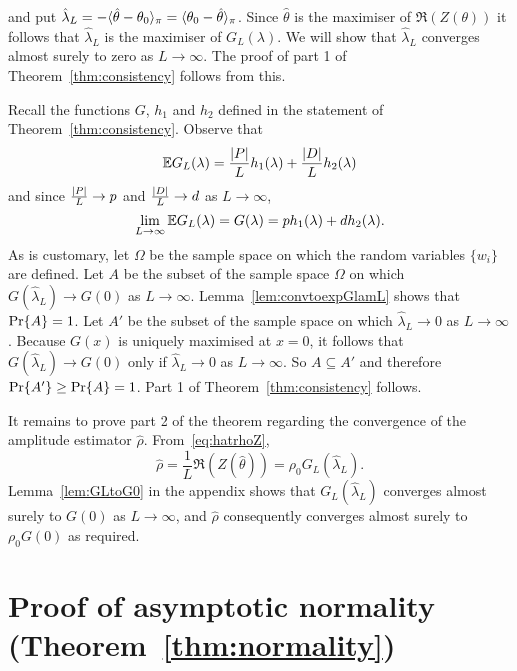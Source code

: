 \documentclass[journal]{IEEEtran}
\begin{document}
and put $\hat{\lambda}_L = -\langle \hat{\theta} - \theta_0 \rangle_\pi = \langle \theta_0 - \hat{\theta} \rangle_\pi$.  Since $\hat{\theta}$ is the maximiser of $\Re(Z(\theta))$ it follows that $\hat{\lambda}_L$ is the maximiser of $G_L(\lambda)$.  We will show that $\hat{\lambda}_L$ converges almost surely to zero as $L \rightarrow \infty$.  The proof of part 1 of Theorem~\ref{thm:consistency} follows from this.

Recall the functions $G$, $h_1$ and $h_2$ defined in the statement of Theorem~\ref{thm:consistency}.  Observe that
\[
{\mathbb E} G_L(\lambda) = \frac{{\left\vert P \right\vert}}{L} h_1(\lambda) + \frac{{\left\vert D \right\vert}}{L} h_2(\lambda)
\]
and since $\frac{{\left\vert P \right\vert}}{L} \rightarrow p$ and $\frac{{\left\vert D \right\vert}}{L} \rightarrow d$ as $L \rightarrow \infty$,
\[
\lim_{L \rightarrow\infty} {\mathbb E} G_L(\lambda) = G(\lambda) = p h_1(\lambda)   +  d h_2(\lambda).
\]
As is customary, let $\Omega$ be the sample space on which the random variables $\{w_i\}$ are defined.  Let $A$ be the subset of the sample space $\Omega$ on which $G(\hat{\lambda}_L) \rightarrow G(0)$ as $L\rightarrow\infty$.  Lemma~\ref{lem:convtoexpGlamL} shows that ${\operatorname{Pr}}\{A\} = 1$.  Let $A'$ be the subset of the sample space on which $\hat{\lambda}_L \rightarrow 0$ as $L\rightarrow \infty$.  Because $G(x)$ is uniquely maximised at $x=0$, it follows that $G(\hat{\lambda}_L) \rightarrow G(0)$ only if $\hat{\lambda}_L \rightarrow 0$ as $L \rightarrow\infty$. So $A \subseteq A'$ and therefore ${\operatorname{Pr}}\{A'\} \geq {\operatorname{Pr}}\{A\} = 1$.  Part 1 of Theorem~\ref{thm:consistency} follows.  

It remains to prove part 2 of the theorem regarding the convergence of the amplitude estimator $\hat{\rho}$.  From~\eqref{eq:hatrhoZ},
\begin{equation}\label{eq:rhoGLZ}
\hat{\rho} = \frac{1}{L}\Re(Z(\hat{\theta})) = \rho_0 G_L(\hat{\lambda}_L).
\end{equation}  
Lemma~\ref{lem:GLtoG0} in the appendix shows that $G_L(\hat{\lambda}_L)$ converges almost surely to $G(0)$ as $L\rightarrow\infty$, and $\hat{\rho}$ consequently converges almost surely to $\rho_0 G(0)$ as required.  %


\section{Proof of asymptotic normality (Theorem~\ref{thm:normality}) } \label{sec:proof-asympt-norm}
\end{document}
